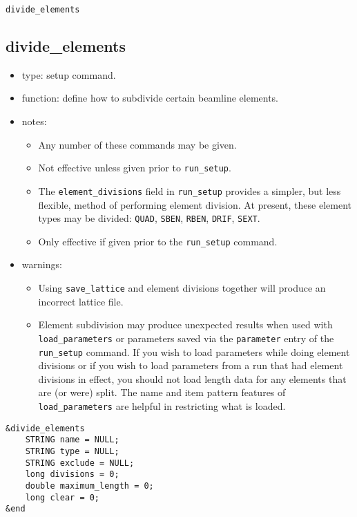 \documentclass[11pt]{article}
\begin{document}
\begin{latexonly}
\newpage
\begin{center}{\Large\verb|divide_elements|}\end{center}
\end{latexonly}
\subsection{divide\_elements}

\begin{itemize}
\item type: setup command.
\item function: define how to subdivide certain beamline elements.
\item notes: 
	\begin{itemize}
	\item Any number of these commands may be given.  
	\item Not effective unless given prior to \verb|run_setup|.
	\item The \verb|element_divisions|
 field in \verb|run_setup| provides a simpler, but less flexible, method of performing
 element division.  At present, these element types may be divided: 
 \verb|QUAD|, \verb|SBEN|, \verb|RBEN|, \verb|DRIF|,  \verb|SEXT|.
	\item Only effective if given prior to the \verb|run_setup| command.
	\end{itemize}
\item warnings:	
	\begin{itemize}
	\item Using \verb|save_lattice| and element divisions together will
	produce an incorrect lattice file.
	\item Element subdivision may
	produce unexpected results when used with \verb|load_parameters|
	or parameters saved via the \verb|parameter|
	entry of the \verb|run_setup| command.
	If you wish to load parameters while doing element divisions or if
	you wish to load parameters from a run that had element divisions
	in effect, you should not load length data for any elements that
	are (or were) split.  The name and item pattern features of 
	\verb|load_parameters| are helpful in restricting what is loaded.
	\end{itemize}
\end{itemize}

\begin{verbatim}
&divide_elements
    STRING name = NULL;
    STRING type = NULL;
    STRING exclude = NULL;
    long divisions = 0;
    double maximum_length = 0;
    long clear = 0;
&end
\end{verbatim}
\end{document}
